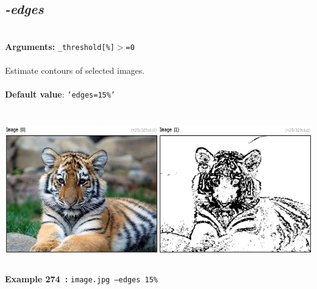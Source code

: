 \documentclass[a4paper,11pt,twoside]{book}
\begin{document}
\subsection{\emph{-edges} }\vspace*{-0.5em}
~\\\textbf{Arguments: } 
{\small \texttt{\_threshold[\%]$>$=0}}\\~\\
Estimate contours of selected images.
~\\~\\\textbf{Default value}: {\small \texttt{'edges=15\%'}}
\begin{center}\includegraphics[keepaspectratio=true,height=7cm,width=\textwidth]{img/gmic_def274.jpg}\\
{\footnotesize \textbf{Example 274~:} \texttt{image.jpg --edges 15\%}}
\end{center}
\end{document}
